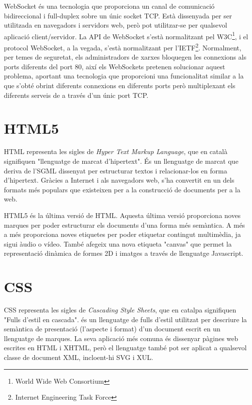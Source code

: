 WebSocket és una tecnologia que proporciona un canal de comunicació bidireccional i full-duplex sobre un únic socket TCP. Està dissenyada per ser utilitzada en navegadors i servidors web, però pot utilitzar-se per qualsevol aplicació client/servidor. La API de WebSocket s'està normalitzant pel W3C\footnote{World Wide Web Consortium}, i el protocol WebSocket, a la vegada, s'està normalitzant per l'IETF\footnote{Internet Engineering Task Force}. Normalment, per temes de seguretat, els administradors de xarxes bloquegen les connexions als ports diferents del port 80, així els WebSockets pretenen solucionar aquest problema, aportant una tecnologia que proporcioni una funcionalitat similar a la que s'obté obrint diferents connexions en diferents ports però multiplexant els diferents serveis de a través d'un únic port TCP.

\section{HTML5}

HTML representa les sigles de \emph{Hyper Text Markup Language}, que en català signifiquen "llenguatge de marcat d'hipertext". És un llenguatge de marcat que deriva de l'SGML dissenyat per estructurar textos i relacionar-los en forma d'hipertext. Gràcies a Internet i als navegadors web, s'ha convertit en un dels formats més populars que existeixen per a la construcció de documents per a la web. 

HTML5 és la última versió de HTML. Aquesta última versió proporciona noves marques per poder estructurar els documents d'una forma més semàntica. A més a més proporciona noves etiquetes per poder etiquetar contingut multimèdia, ja sigui àudio o vídeo. També afegeix una nova etiqueta "canvas" que permet la representació dinàmica de formes 2D i imatges a través de llenguatge Javascript. 

\section{CSS}

CSS representa les sigles de \emph{Cascading Style Sheets}, que en catalpa signifiquen "Fulls d'estil en cascada". és un llenguatge de fulls d'estil utilitzat per descriure la semàntica de presentació (l'aspecte i format) d'un document escrit en un llenguatge de marques. La seva aplicació més comuna és dissenyar pàgines web escrites en HTML i XHTML, però el llenguatge també pot ser aplicat a qualsevol classe de document XML, incloent-hi SVG i XUL.

